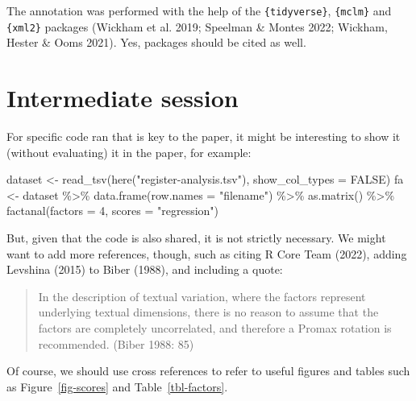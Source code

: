 \documentclass[
  letterpaper,
  DIV=11,
  numbers=noendperiod]{scrartcl}
\newenvironment{Shaded}{\begin{snugshade}}{\end{snugshade}}
\newcommand{\AttributeTok}[1]{\textcolor[rgb]{0.40,0.45,0.13}{#1}}
\newcommand{\ConstantTok}[1]{\textcolor[rgb]{0.56,0.35,0.01}{#1}}
\newcommand{\DecValTok}[1]{\textcolor[rgb]{0.68,0.00,0.00}{#1}}
\newcommand{\FunctionTok}[1]{\textcolor[rgb]{0.28,0.35,0.67}{#1}}
\newcommand{\NormalTok}[1]{\textcolor[rgb]{0.00,0.23,0.31}{#1}}
\newcommand{\OtherTok}[1]{\textcolor[rgb]{0.00,0.23,0.31}{#1}}
\newcommand{\SpecialCharTok}[1]{\textcolor[rgb]{0.37,0.37,0.37}{#1}}
\newcommand{\StringTok}[1]{\textcolor[rgb]{0.13,0.47,0.30}{#1}}
\begin{document}
The annotation was performed with the help of the
\texttt{\{tidyverse\}}, \texttt{\{mclm\}} and \texttt{\{xml2\}} packages
(Wickham et al. 2019; Speelman \& Montes 2022; Wickham, Hester \& Ooms
2021). Yes, packages should be cited as well.

\hypertarget{intermediate-session}{%
\section{Intermediate session}\label{intermediate-session}}

For specific code ran that is key to the paper, it might be interesting
to show it (without evaluating) it in the paper, for example:

\begin{Shaded}
\begin{Highlighting}[]
\NormalTok{dataset }\OtherTok{\textless{}{-}} \FunctionTok{read\_tsv}\NormalTok{(}\FunctionTok{here}\NormalTok{(}\StringTok{"register{-}analysis.tsv"}\NormalTok{), }\AttributeTok{show\_col\_types =} \ConstantTok{FALSE}\NormalTok{)}
\NormalTok{fa }\OtherTok{\textless{}{-}}\NormalTok{ dataset }\SpecialCharTok{\%\textgreater{}\%} \FunctionTok{data.frame}\NormalTok{(}\AttributeTok{row.names =} \StringTok{"filename"}\NormalTok{) }\SpecialCharTok{\%\textgreater{}\%} 
  \FunctionTok{as.matrix}\NormalTok{() }\SpecialCharTok{\%\textgreater{}\%} \FunctionTok{factanal}\NormalTok{(}\AttributeTok{factors =} \DecValTok{4}\NormalTok{, }\AttributeTok{scores =} \StringTok{"regression"}\NormalTok{)}
\end{Highlighting}
\end{Shaded}

But, given that the code is also shared, it is not strictly necessary.
We might want to add more references, though, such as citing R Core Team
(2022), adding Levshina (2015) to Biber (1988), and including a quote:

\begin{quote}
In the description of textual variation, where the factors represent
underlying textual dimensions, there is no reason to assume that the
factors are completely uncorrelated, and therefore a Promax rotation is
recommended. (Biber 1988: 85)
\end{quote}

Of course, we should use cross references to refer to useful figures and
tables such as Figure~\ref{fig-scores} and Table~\ref{tbl-factors}.
\end{document}
